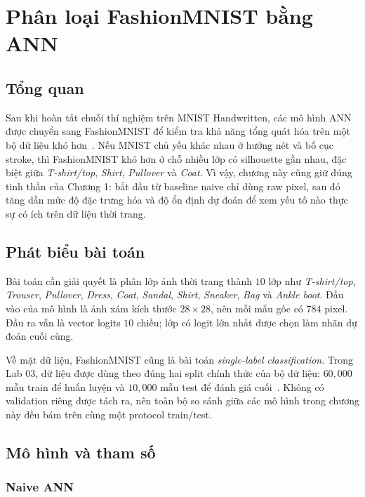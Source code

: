 \chapter{Phân loại FashionMNIST bằng ANN}

\section{Tổng quan}

Sau khi hoàn tất chuỗi thí nghiệm trên MNIST Handwritten, các mô hình ANN được chuyển sang FashionMNIST để kiểm tra khả năng tổng quát hóa trên một bộ dữ liệu khó hơn~\cite{xiao2017fashion,fashionmnist_repo}. Nếu MNIST chủ yếu khác nhau ở hướng nét và bố cục stroke, thì FashionMNIST khó hơn ở chỗ nhiều lớp có silhouette gần nhau, đặc biệt giữa \textit{T-shirt/top}, \textit{Shirt}, \textit{Pullover} và \textit{Coat}. Vì vậy, chương này cũng giữ đúng tinh thần của Chương 1: bắt đầu từ baseline naive chỉ dùng raw pixel, sau đó tăng dần mức độ đặc trưng hóa và độ ổn định dự đoán để xem yếu tố nào thực sự có ích trên dữ liệu thời trang.

\section{Phát biểu bài toán}

Bài toán cần giải quyết là phân lớp ảnh thời trang thành $10$ lớp như \textit{T-shirt/top}, \textit{Trouser}, \textit{Pullover}, \textit{Dress}, \textit{Coat}, \textit{Sandal}, \textit{Shirt}, \textit{Sneaker}, \textit{Bag} và \textit{Ankle boot}. Đầu vào của mô hình là ảnh xám kích thước $28 \times 28$, nên mỗi mẫu gốc có $784$ pixel. Đầu ra vẫn là vector logits $10$ chiều; lớp có logit lớn nhất được chọn làm nhãn dự đoán cuối cùng.

Về mặt dữ liệu, FashionMNIST cũng là bài toán \textit{single-label classification}. Trong Lab 03, dữ liệu được dùng theo đúng hai split chính thức của bộ dữ liệu: $60{,}000$ mẫu train để huấn luyện và $10{,}000$ mẫu test để đánh giá cuối~\cite{xiao2017fashion}. Không có validation riêng được tách ra, nên toàn bộ so sánh giữa các mô hình trong chương này đều bám trên cùng một protocol train/test.



\section{Mô hình và tham số}
\subsection{Naive ANN}

